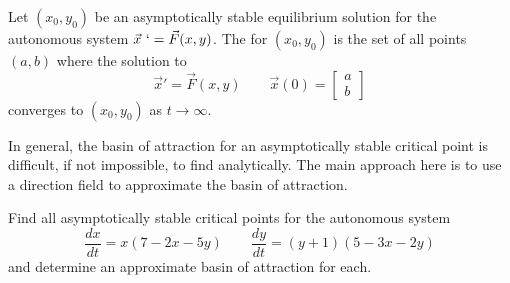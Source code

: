 \documentclass{ximera}
\begin{document}
\begin{definition}
    Let $(x_0, y_0)$ be an asymptotically stable equilibrium solution for the autonomous system $\vec{x}\ ` = \vec{F}(x,y)$. The \emph{} for $(x_0, y_0)$ is the set of all points $(a,b)$ where the solution to
    \begin{equation*}
        \vec{x}' = \vec{F}(x,y) \qquad \vec{x}(0) = \begin{bmatrix} a \\ b \end{bmatrix}
    \end{equation*}
    converges to $(x_0, y_0)$ as $t \rightarrow \infty$.
\end{definition}

In general, the basin of attraction for an asymptotically stable critical point is difficult, if not impossible, to find analytically. The main approach here is to use a direction field to approximate the basin of attraction.

\begin{example} \label{ex:BoA}
    Find all asymptotically stable critical points for the autonomous system
    \begin{equation*}
        \frac{dx}{dt} = x(7-2x-5y) \qquad \frac{dy}{dt} =(y+1)(5-3x-2y)
    \end{equation*}
    and determine an approximate basin of attraction for each. 
\end{example}
\end{document}

